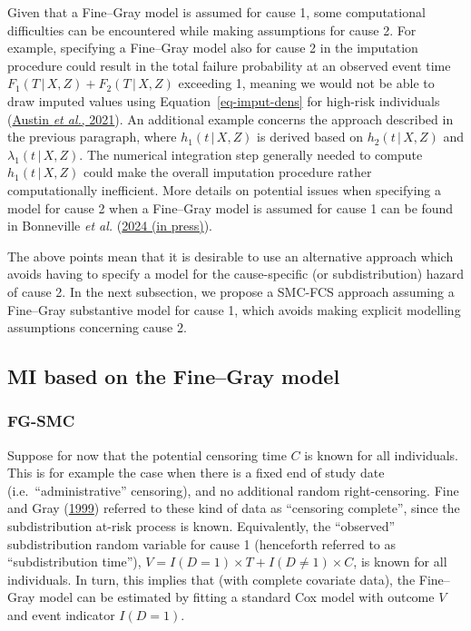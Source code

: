 \documentclass[
  letterpaper,
  DIV=11,
  numbers=noendperiod]{scrreprt}
\newcommand{\given}{\,|\,}
\begin{document}
Given that a Fine--Gray model is assumed for cause 1, some computational
difficulties can be encountered while making assumptions for cause 2.
For example, specifying a Fine--Gray model also for cause 2 in the
imputation procedure could result in the total failure probability at an
observed event time \(F_1(T \given X, Z) + F_2(T \given X, Z)\)
exceeding 1, meaning we would not be able to draw imputed values using
Equation~\ref{eq-imput-dens} for high-risk individuals
(\protect\hyperlink{ref-austinFineGraySubdistributionHazard2021}{Austin
\emph{et al.}, 2021}). An additional example concerns the approach
described in the previous paragraph, where \(h_1(t \given X, Z)\) is
derived based on \(h_2(t \given X, Z)\) and
\(\lambda_1(t \given X, Z)\). The numerical integration step generally
needed to compute \(h_1(t \given X, Z)\) could make the overall
imputation procedure rather computationally inefficient. More details on
potential issues when specifying a model for cause 2 when a Fine--Gray
model is assumed for cause 1 can be found in Bonneville \emph{et al.}
(\protect\hyperlink{ref-bonnevilleWhyYouShould2024}{2024 (in press)}).

The above points mean that it is desirable to use an alternative
approach which avoids having to specify a model for the cause-specific
(or subdistribution) hazard of cause 2. In the next subsection, we
propose a SMC-FCS approach assuming a Fine--Gray substantive model for
cause 1, which avoids making explicit modelling assumptions concerning
cause 2.

\hypertarget{sec-subdist-time}{%
\subsection{MI based on the Fine--Gray model}\label{sec-subdist-time}}

\hypertarget{sec-fg-smc}{%
\subsubsection{FG-SMC}\label{sec-fg-smc}}

Suppose for now that the potential censoring time \(C\) is known for all
individuals. This is for example the case when there is a fixed end of
study date (i.e.~``administrative'' censoring), and no additional random
right-censoring. Fine and Gray
(\protect\hyperlink{ref-fineProportionalHazardsModel1999}{1999})
referred to these kind of data as ``censoring complete'', since the
subdistribution at-risk process is known. Equivalently, the ``observed''
subdistribution random variable for cause 1 (henceforth referred to as
``subdistribution time''),
\(V = I(D = 1) \times T + I(D \neq 1) \times C\), is known for all
individuals. In turn, this implies that (with complete covariate data),
the Fine--Gray model can be estimated by fitting a standard Cox model
with outcome \(V\) and event indicator \(I(D = 1)\).
\end{document}
